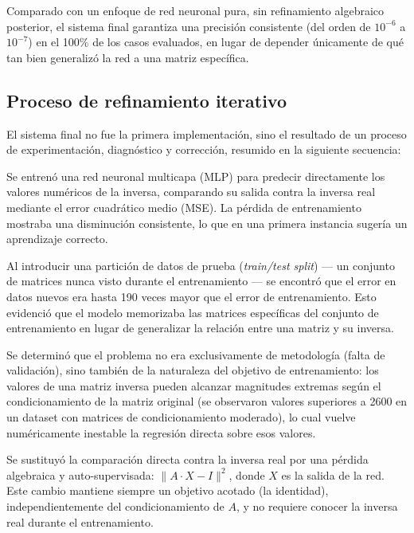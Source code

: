 \documentclass[12pt,a4paper]{article}
\begin{document}
Comparado con un enfoque de red neuronal pura, sin refinamiento algebraico posterior, el sistema final garantiza una precisión consistente (del orden de $10^{-6}$ a $10^{-7}$) en el 100\% de los casos evaluados, en lugar de depender únicamente de qué tan bien generalizó la red a una matriz específica.

\subsection{Proceso de refinamiento iterativo}

El sistema final no fue la primera implementación, sino el resultado de un proceso de experimentación, diagnóstico y corrección, resumido en la siguiente secuencia:

\begin{description}[leftmargin=0pt, style=nextline]
    \item[Paso 1 --- Primera versión: regresión directa.] Se entrenó una red neuronal multicapa (MLP) para predecir directamente los valores numéricos de la inversa, comparando su salida contra la inversa real mediante el error cuadrático medio (MSE). La pérdida de entrenamiento mostraba una disminución consistente, lo que en una primera instancia sugería un aprendizaje correcto.

    \item[Paso 2 --- Diagnóstico: sobreajuste (\textit{overfitting}).] Al introducir una partición de datos de prueba (\textit{train/test split}) --- un conjunto de matrices nunca visto durante el entrenamiento --- se encontró que el error en datos nuevos era hasta 190 veces mayor que el error de entrenamiento. Esto evidenció que el modelo memorizaba las matrices específicas del conjunto de entrenamiento en lugar de generalizar la relación entre una matriz y su inversa.

    \item[Paso 3 --- Identificación de la causa raíz.] Se determinó que el problema no era exclusivamente de metodología (falta de validación), sino también de la naturaleza del objetivo de entrenamiento: los valores de una matriz inversa pueden alcanzar magnitudes extremas según el condicionamiento de la matriz original (se observaron valores superiores a 2600 en un dataset con matrices de condicionamiento moderado), lo cual vuelve numéricamente inestable la regresión directa sobre esos valores.

    \item[Paso 4 --- Rediseño de la función de pérdida.] Se sustituyó la comparación directa contra la inversa real por una pérdida algebraica y auto-supervisada: $\|A \cdot X - I\|^2$, donde $X$ es la salida de la red. Este cambio mantiene siempre un objetivo acotado (la identidad), independientemente del condicionamiento de $A$, y no requiere conocer la inversa real durante el entrenamiento.


\end{description}
\end{document}
